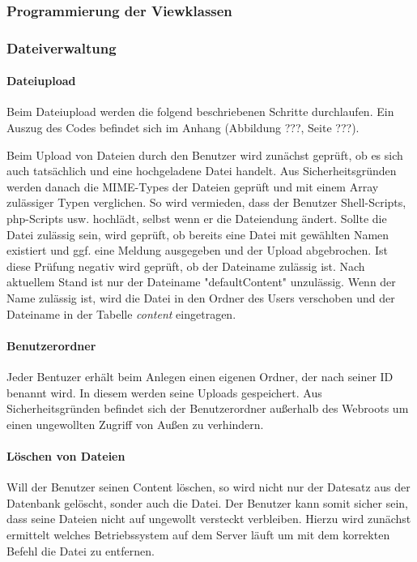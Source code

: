 \documentclass[10pt]{scrarticle}
\begin{document}
\subsubsection{Programmierung der Viewklassen}
\subsubsection{Dateiverwaltung}



\paragraph{Dateiupload}

Beim Dateiupload werden die folgend beschriebenen Schritte durchlaufen. Ein Auszug des Codes befindet sich im Anhang (Abbildung ???, Seite ???).

Beim Upload von Dateien durch den Benutzer wird zunächst geprüft, ob es sich auch tatsächlich und eine hochgeladene Datei handelt. Aus Sicherheitsgründen werden danach die MIME-Types der Dateien geprüft und mit einem Array zulässiger Typen verglichen. So wird vermieden, dass der Benutzer Shell-Scripts, php-Scripts usw. hochlädt, selbst wenn er die Dateiendung ändert. Sollte die Datei zulässig sein, wird geprüft, ob bereits eine Datei mit gewählten Namen existiert und ggf. eine Meldung ausgegeben und der Upload abgebrochen. Ist diese Prüfung negativ wird geprüft, ob der Dateiname zulässig ist. Nach aktuellem Stand ist nur der Dateiname "defaultContent" unzulässig. Wenn der Name zulässig ist, wird die Datei in den Ordner des Users verschoben und der Dateiname in der Tabelle \textit{content} eingetragen.

\paragraph{Benutzerordner}

Jeder Bentuzer erhält beim Anlegen einen eigenen Ordner, der nach seiner ID benannt wird. In diesem werden seine Uploads gespeichert. Aus Sicherheitsgründen befindet sich der Benutzerordner außerhalb des Webroots um einen ungewollten Zugriff von Außen zu verhindern.

\paragraph{Löschen von Dateien}
Will der Benutzer seinen Content löschen, so wird nicht nur der Datesatz aus der Datenbank gelöscht, sonder auch die Datei. Der Benutzer kann somit sicher sein, dass seine Dateien nicht auf ungewollt versteckt verbleiben. Hierzu wird zunächst ermittelt welches Betriebssystem auf dem Server läuft um mit dem korrekten Befehl die Datei zu entfernen.
\end{document}
